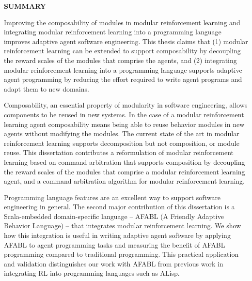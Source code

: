 \clearpage
\begin{centering}
\textbf{SUMMARY}\\
\vspace{\baselineskip}
\end{centering}

Improving the composability of modules in modular reinforcement learning and integrating modular reinforcement learning into a programming language improves adaptive agent software engineering.  This thesis claims that (1) modular reinforcement learning can be extended to support composability by decoupling the reward scales of the modules that comprise the agents, and (2) integrating modular reinforcement learning into a programming language supports adaptive agent programming by reducing the effort required to write agent programs and adapt them to new domains.

Composability, an essential property of modularity in software engineering, allows components to be reused in new systems.  In the case of a modular reinforcement learning agent composability means being able to reuse behavior modules in new agents without modifying the modules.  The current state of the art in modular reinforcement learning supports decomposition but not composition, or module reuse.  This dissertation contributes a reformulation of modular reinforcement learning based on command arbitration that supports composition by decoupling the reward scales of the modules that comprise a modular reinforcement learning agent, and a command arbitration algorithm for modular reinforcement learning.

Programming language features are an excellent way to support software engineering in general. The second major contribution of this dissertation is a Scala-embedded domain-specific language -- AFABL (A Friendly Adaptive Behavior Language) -- that integrates modular reinforcement learning.  We show how this integration is useful in writing adaptive agent software by applying AFABL to agent programming tasks and measuring the benefit of AFABL programming compared to traditional programming.  This practical application and validation distinguishes our work with AFABL from previous work in integrating RL into programming languages such as ALisp.

